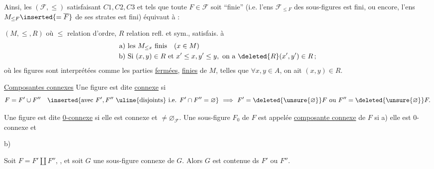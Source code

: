  Ainsi, les  $(\mathcal F,\leq)$ satisfaisant $C1,C2,C3$ et tels que toute $F\in\mathcal F$ soit ``finie'' (i.e. l'ens $\mathcal F_{\leq F}$ des sous-figures est fini, ou encore, l'ens $M_{\leq F}\inserted{=\overline F}$  de  ses strates est fini) équivaut à :

$(M,\leq,R)$  où $\leq$ relation d'ordre, $R$ relation refl. et sym., satisfais. à
\[
\begin{aligned}
\text{a) }&\text{les }M_{\leq x}\text{ finis}\quad(x\in M)\\
\text{b) }&\text{Si }(x,y)\in R\text{ et }x'\leq x,y'\leq y,\ \text{on a }\deleted{R}(x',y')\in R\,;
\end{aligned}
\]
où les figures sont interprétées comme les parties \uline{fermées}, \uline{finies}  de $M$, telles que $\forall x,y\in A$, on ait $(x,y)\in R$.


\uline{Composantes connexes} Une figure est dite \uline{connexe} si 
\[
F=F'\cup F''\quad
\inserted{\text{avec }F',F''\ \text{\uline{disjoints} i.e. }F'\cap F''=\varnothing}
\ \Longrightarrow\ F'=\deleted{\unsure{\varnothing}}F\ \text{ou }F''=\deleted{\unsure{\varnothing}}F.
\]


Une figure est dite \uline{0-connexe} si elle est connexe et $\ne\varnothing_{\mathcal F}$. Une sous-figure $F_0$ de $F$ est appelée \uline{composante connexe} de $F$ si a) elle est 0-connexe et

b)   

  Soit $F=F'\amalg F''$, , et soit $G$ une sous-figure connexe de $G$. Alors $G$ est contenue ds $F'$ ou $F''$.

